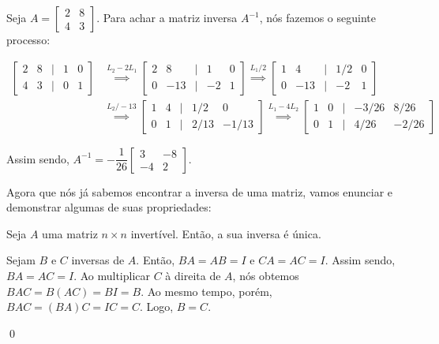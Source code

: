 \begin{Example}
	Seja $A = \begin{bmatrix}
		2 & 8 \\
		4 & 3
	\end{bmatrix}$. Para achar a matriz inversa $A^{-1}$, nós fazemos o seguinte processo:

	\begin{align*}
		\begin{bmatrix}
			2 & 8 & | & 1 & 0 \\
			4 & 3 & | & 0 & 1
		\end{bmatrix} & \overset{L_2 - 2L_1}{\implies} \begin{bmatrix}
			2 & 8 & | & 1 & 0 \\
			0 & -13 & | & -2 & 1
		\end{bmatrix} \overset{L_1 / 2}{\implies}
		\begin{bmatrix}
			1 & 4 & | & 1/2 & 0 \\
			0 & -13 & | & -2 & 1
		\end{bmatrix} \\ & \overset{L_2 / -13}{\implies}
		\begin{bmatrix}
			1 & 4 & | & 1/2 & 0 \\
			0 & 1 & | & 2/13 & -1/13
		\end{bmatrix} \overset{L_1 - 4L_2}{\implies}
		\begin{bmatrix}
			1 & 0 & | & -3/26 & 8/26 \\
			0 & 1 & | & 4/26 & -2/26
		\end{bmatrix}
	\end{align*}
	
	Assim sendo, $A^{-1} = -\dfrac{1}{26}\begin{bmatrix}
		3 & -8 \\
		-4 & 2
	\end{bmatrix}$.
\end{Example}

Agora que nós já sabemos encontrar a inversa de uma matriz, vamos enunciar e demonstrar algumas de suas propriedades:

\begin{Proposition}
	Seja $A$ uma matriz $n\times n$ invertível. Então, a sua inversa é única.
\end{Proposition}

\begin{Proof}
	Sejam $B$ e $C$ inversas de $A$. Então, $BA = AB = I$ e $CA = AC = I$. Assim sendo, $BA = AC = I$. Ao multiplicar $C$ à direita de $A$, nós obtemos $BAC = B(AC) = BI = B$. Ao mesmo tempo, porém, $BAC = (BA)C = IC = C$. Logo, $B = C$.
	
	\qed
\end{Proof}

